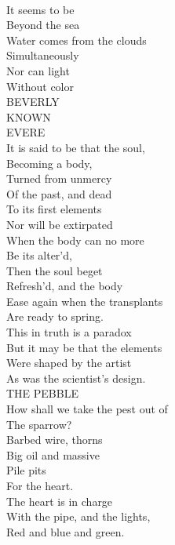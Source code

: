 \documentclass[smalldemyvopaper,11pt,twoside,onecolumn,openright,extrafontsizes]{memoir}
\begin{document}
\\It seems to be
\\Beyond the sea
\\Water comes from the clouds
\\Simultaneously
\\Nor can light
\\Without color
\\BEVERLY
\\KNOWN
\\EVERE
\\It is said to be that the soul,
\\Becoming a body,
\\Turned from unmercy
\\Of the past, and dead
\\To its first elements
\\Nor will be extirpated
\\When the body can no more
\\Be its alter'd,
\\Then the soul beget
\\Refresh'd, and the body
\\Ease again when the transplants
\\Are ready to spring.
\\This in truth is a paradox
\\But it may be that the elements
\\Were shaped by the artist
\\As was the scientist's design.
\\THE PEBBLE
\\How shall we take the pest out of
\\The sparrow?
\\Barbed wire, thorns
\\Big oil and massive
\\Pile pits
\\For the heart.
\\The heart is in charge
\\With the pipe, and the lights,
\\Red and blue and green.
\end{document}

